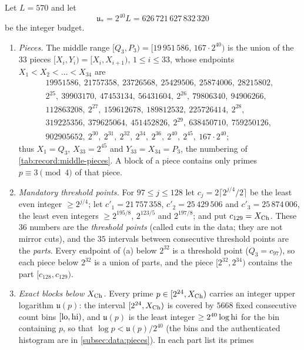 \begin{definition}\label{def:record:exact-blocks}
Let $L=570$ and let
\[
 \mathfrak u_*=2^{40}L=626\,721\,627\,832\,320
\]
be the integer budget.
\begin{enumerate}[label=(\alph*)]
\item \emph{Pieces.} The middle range
 $[Q_3,P_3)=[19\,951\,586,\,167\cdot2^{40})$ is the union of the $33$ pieces
 $[X_i,Y_i)=[X_i,X_{i+1})$, $1\le i\le33$, whose endpoints
 $X_1<X_2<\dots<X_{34}$ are
 \begin{gather*}
  19951586,\ 21757358,\ 23726568,\ 25429506,\ 25874006,\ 28215802,\\
  2^{25},\ 39903170,\ 47453134,\ 56431604,\ 2^{26},\ 79806340,\
  94906266,\\ 112863208,\ 2^{27},\ 159612678,\ 189812532,\ 225726414,\
  2^{28},\\ 319225356,\ 379625064,\ 451452826,\ 2^{29},\ 638450710,\
  759250126,\\ 902905652,\ 2^{30},\ 2^{31},\ 2^{32},\ 2^{34},\ 2^{36},\
  2^{40},\ 2^{45},\ 167\cdot2^{40};
 \end{gather*}
 thus $X_1=Q_3$, $X_{33}=2^{45}$ and $Y_{33}=X_{34}=P_3$, the numbering of
 \cref{tab:record:middle-pieces}. A block of a piece contains only primes
 $p\equiv3\pmod4$ of that piece.
\item \emph{Mandatory threshold points.} For $97\le j\le128$ let
 $c_j=2\lceil2^{j/4}/2\rceil$ be the least even integer $\ge2^{j/4}$; let
 $c'_1=21\,757\,358$, $c'_2=25\,429\,506$ and $c'_3=25\,874\,006$, the least
 even integers $\ge2^{195/8}$, $2^{123/5}$ and $2^{197/8}$; and put
 $c_{129}=X_{\rm Ch}$. These $36$ numbers are the \emph{threshold points} (called cuts in the data; they are not mirror cuts), and the $35$ intervals between consecutive threshold points are the \emph{parts}. Every endpoint of (a) below $2^{32}$ is a threshold point ($Q_3=c_{97}$), so each piece below $2^{32}$ is a
 union of parts, and the piece $[2^{32},2^{34})$ contains the part
 $[c_{128},c_{129})$.
\item \emph{Exact blocks below $X_{\rm Ch}$.} Every prime
 $p\in[2^{24},X_{\rm Ch})$ carries an integer upper logarithm
 $\mathfrak u(p)$: the interval $[2^{24},X_{\rm Ch})$ is covered by $5668$
 fixed consecutive count bins $[{\rm lo},{\rm hi})$, and $\mathfrak u(p)$ is
 the least integer $\ge2^{40}\log{\rm hi}$ for the bin containing $p$, so
 that $\log p<\mathfrak u(p)/2^{40}$ (the bins and the authenticated
 histogram are in \cref{subsec:data:pieces}). In each part list its primes

\end{enumerate}
\end{definition}
